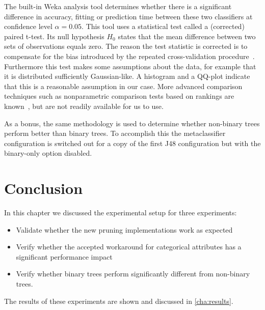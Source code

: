 The built-in Weka analysis tool determines whether there is a significant difference in accuracy, fitting or prediction time between these two classifiers at confidence level $\alpha = 0.05$. This tool uses a statistical test called a (corrected) paired t-test. Its null hypothesis $H_0$ states that the mean difference between two sets of observations equals zero. The reason the test statistic is corrected is to compensate for the bias introduced by the repeated cross-validation procedure~\cite{statcomparison-learning}. Furthermore this test makes some assumptions about the data, for example that it is distributed sufficiently Gaussian-like. A histogram and a QQ-plot indicate that this is a reasonable assumption in our case. More advanced comparison techniques such as nonparametric comparison tests based on rankings are known~\cite{statcomparison}, but are not readily available for us to use.

As a bonus, the same methodology is used to determine whether non-binary trees perform better than binary trees. To accomplish this the metaclassifier configuration is switched out for a copy of the first J48 configuration but with the binary-only option disabled.

\section{Conclusion}
In this chapter we discussed the experimental setup for three experiments:
\begin{itemize}
    \item Validate whether the new pruning implementations work as expected
    \item Verify whether the accepted workaround for categorical attributes has a significant performance impact
    \item Verify whether binary trees perform significantly different from non-binary trees.
\end{itemize}

The results of these experiments are shown and discussed in \autoref{cha:results}.